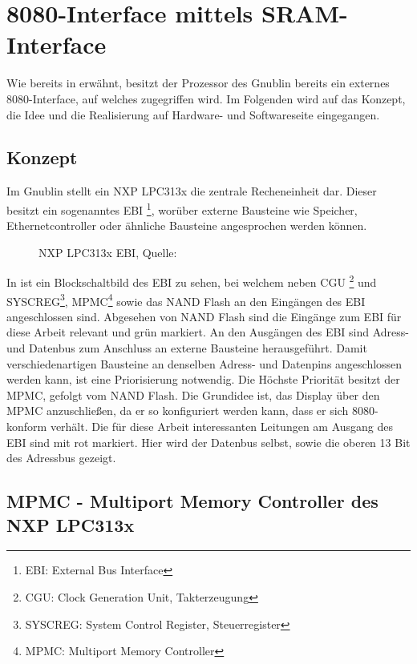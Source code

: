 \section{8080-Interface mittels SRAM-Interface}
\label{sec:TeilA_8080SRAM}
Wie bereits in  erwähnt, besitzt der Prozessor des Gnublin bereits ein externes 8080-Interface, auf welches zugegriffen wird. Im Folgenden wird auf das Konzept, die Idee und die Realisierung auf Hardware- und Softwareseite eingegangen.
\newpage
\subsection{Konzept}
\label{cha:teila_konzept}
Im Gnublin stellt ein NXP LPC313x die zentrale Recheneinheit dar. Dieser besitzt ein sogenanntes EBI \footnote{EBI: External Bus Interface}, worüber externe Bausteine wie Speicher, Ethernetcontroller oder ähnliche Bausteine angesprochen werden können.

\begin{figure}[htp]
	\centering
{}
	\caption{NXP LPC313x EBI, Quelle: \cite{NXP2010}}
	\label{fig:lpc_ebi}
\end{figure}

In  ist ein Blockschaltbild des EBI zu sehen, bei welchem neben CGU \footnote{CGU: Clock Generation Unit, Takterzeugung} und SYSCREG\footnote{SYSCREG: System Control Register, Steuerregister}, MPMC\footnote{MPMC: Multiport Memory Controller} sowie das NAND Flash an den Eingängen des EBI angeschlossen sind. Abgesehen von NAND Flash sind die Eingänge zum EBI für diese Arbeit relevant und grün markiert. An den Ausgängen des EBI sind Adress- und Datenbus zum Anschluss an externe Bausteine herausgeführt. Damit verschiedenartigen Bausteine an denselben Adress- und Datenpins angeschlossen werden kann, ist eine Priorisierung notwendig. Die Höchste Priorität besitzt der MPMC, gefolgt vom NAND Flash. 
Die Grundidee ist, das Display über den MPMC anzuschließen, da er so konfiguriert werden kann, dass er sich 8080-konform verhält. Die für diese Arbeit interessanten Leitungen am Ausgang des EBI sind mit rot markiert. Hier wird der Datenbus selbst, sowie die oberen 13 Bit des Adressbus gezeigt.


\subsection{MPMC - Multiport Memory Controller des NXP LPC313x}
\label{cha:mpmc}

